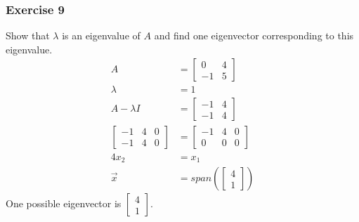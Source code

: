 \documentclass{math}
\begin{document}
\subsubsection*{Exercise 9}
Show that \( \lambda \) is an eigenvalue of \( A \) and find one eigenvector
corresponding to this eigenvalue.
\begin{align*}
  A &= \begin{bmatrix}0 & 4 \\ -1 & 5\end{bmatrix} \\
  \lambda &= 1 \\
  A-\lambda I &= \begin{bmatrix}-1 & 4 \\ -1 & 4\end{bmatrix} \\
  \left[\begin{array}{cc|c}
    -1 & 4 & 0 \\
    -1 & 4 & 0
  \end{array}\right] &= \begin{bmatrix}
    -1 & 4 & 0 \\
    0 & 0 & 0
  \end{bmatrix} \\
  4x_2 &= x_1 \\
  \vec{x} &= span\left(\begin{bmatrix}4 \\ 1\end{bmatrix}\right)
\end{align*}
One possible eigenvector is \( \begin{bmatrix}4 \\ 1\end{bmatrix} \).
\end{document}
